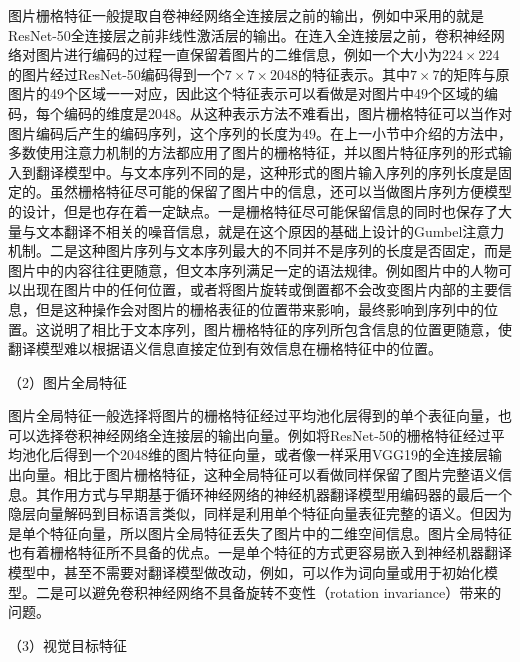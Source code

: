 图片栅格特征一般提取自卷神经网络全连接层之前的输出，例如中采用的就是ResNet-50全连接层之前非线性激活层的输出。在连入全连接层之前，卷积神经网络对图片进行编码的过程一直保留着图片的二维信息，例如一个大小为$224 \times 224$的图片经过ResNet-50编码得到一个$7 \times 7 \times 2048$的特征表示。其中$7 \times 7$的矩阵与原图片的49个区域一一对应，因此这个特征表示可以看做是对图片中49个区域的编码，每个编码的维度是2048。从这种表示方法不难看出，图片栅格特征可以当作对图片编码后产生的编码序列，这个序列的长度为49。在上一小节中介绍的方法中，多数使用注意力机制的方法都应用了图片的栅格特征，并以图片特征序列的形式输入到翻译模型中。与文本序列不同的是，这种形式的图片输入序列的序列长度是固定的。虽然栅格特征尽可能的保留了图片中的信息，还可以当做图片序列方便模型的设计，但是也存在着一定缺点。一是栅格特征尽可能保留信息的同时也保存了大量与文本翻译不相关的噪音信息，就是在这个原因的基础上设计的Gumbel注意力机制。二是这种图片序列与文本序列最大的不同并不是序列的长度是否固定，而是图片中的内容往往更随意，但文本序列满足一定的语法规律。例如图片中的人物可以出现在图片中的任何位置，或者将图片旋转或倒置都不会改变图片内部的主要信息，但是这种操作会对图片的栅格表征的位置带来影响，最终影响到序列中的位置。这说明了相比于文本序列，图片栅格特征的序列所包含信息的位置更随意，使翻译模型难以根据语义信息直接定位到有效信息在栅格特征中的位置。

{\sffamily （2）图片全局特征}

图片全局特征一般选择将图片的栅格特征经过平均池化层得到的单个表征向量，也可以选择卷积神经网络全连接层的输出向量。例如将ResNet-50的栅格特征经过平均池化后得到一个2048维的图片特征向量，或者像一样采用VGG19的全连接层输出向量。相比于图片栅格特征，这种全局特征可以看做同样保留了图片完整语义信息。其作用方式与早期基于循环神经网络的神经机器翻译模型用编码器的最后一个隐层向量解码到目标语言类似，同样是利用单个特征向量表征完整的语义。但因为是单个特征向量，所以图片全局特征丢失了图片中的二维空间信息。图片全局特征也有着栅格特征所不具备的优点。一是单个特征的方式更容易嵌入到神经机器翻译模型中，甚至不需要对翻译模型做改动，例如，可以作为词向量或用于初始化模型。二是可以避免卷积神经网络不具备旋转不变性（rotation invariance）带来的问题。

{\sffamily （3）视觉目标特征}

